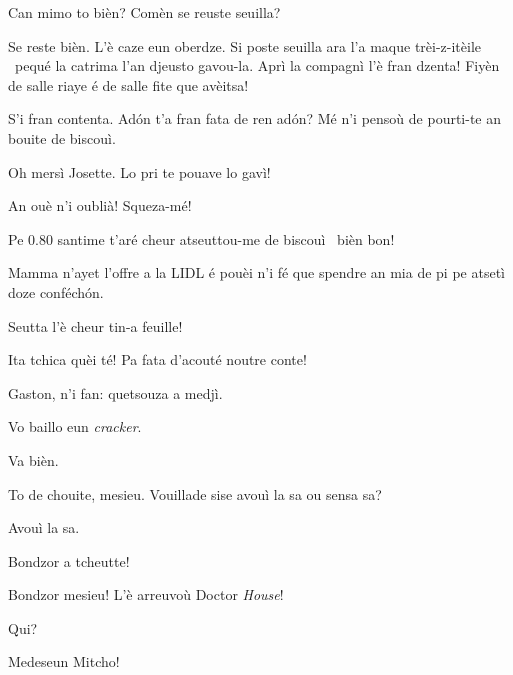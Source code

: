 \begin{drama}

\Feliespeaks Can mimo to bièn? Comèn se reuste seuilla?

\Gerominespeaks {} Se reste bièn. L’è caze eun oberdze. Si poste seuilla ara l’a maque trèi-z-itèile \stella\ pequé la catrima l’an djeusto gavou-la.  Aprì la compagnì l’è fran dzenta! Fiyèn de salle riaye é de salle fite que avèitsa!

\Feliespeaks S’i fran contenta. Ad\'on t’a fran fata de ren ad\'on? Mé n'i pensoù de pourti-te an bouite de biscouì.

\Gerominespeaks Oh mersì Josette.  Lo pri te pouave lo gavì!

\Feliespeaks An ouè n’i oublià! Squeza-mé!

\Gerominespeaks Pe $0.80$ santime t’aré cheur atseuttou-me de biscouì \biscotto\ bièn bon!

\Feliespeaks Mamma n’ayet l’offre a la LIDL é pouèi n’i fé que spendre an mia de pi pe atsetì doze conféch\'on.

\Casimirspeaks Seutta l’è cheur tin-a feuille!

\Gerominespeaks Ita tchica quèi té! Pa fata d'acouté noutre conte!

\PersEmpourtantaspeaks {} Gaston, n’i fan: quetsouza a medjì.

\Eunfeurmispeaks Vo baillo eun \textit{cracker}. 

\PersEmpourtantaspeaks Va bièn.

\Eunfeurmispeaks To de chouite, mesieu. Vouillade sise avouì la sa ou sensa sa?

\PersEmpourtantaspeaks Avouì la sa. 



\MedMitchospeaks Bondzor a tcheutte!

\Eunfeurmispeaks  Bondzor mesieu! L'è arreuvoù Doctor \textit{House}!

\Casimirspeaks Qui?

\Eunfeurmispeaks Medeseun Mitcho!


\end{drama}
